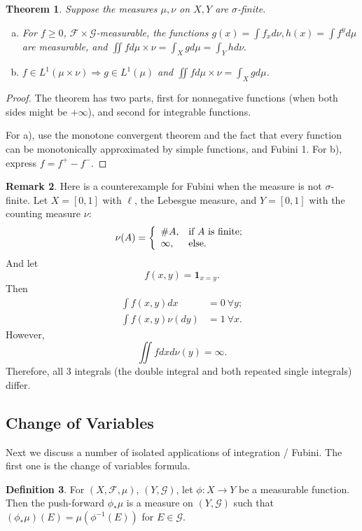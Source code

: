 \documentclass{article}
\newtheorem{theorem}{Theorem}[section]
\theoremstyle{definition}
\newtheorem{definition}[theorem]{Definition}
\newtheorem{remark}[theorem]{Remark}
\begin{document}
\begin{theorem}
	Suppose the measures $\mu,\nu$ on $X,Y$ are $\sigma$-finite.
	\begin{enumerate}[a)]
	\item For $f\geq 0$, $\mathscr{F}\times\mathscr{G}$-measurable,
		the functions $g(x)=\int f_x d\nu, h(x)=\int f^y d\mu$ are measurable, and
		$\iint f d\mu \times \nu = \int_{X} g d\mu = \int_{Y} h d\nu.$
	\item $f\in L^{1}(\mu \times \nu) \Rightarrow g\in L^{1}(\mu)$ 
		and $\iint f d\mu \times \nu = \int_{X} g d\mu$.
	\end{enumerate}
\end{theorem}
\begin{proof}
	The theorem has two parts, first for nonnegative functions
	(when both sides might be $+\infty$), 
	and second for integrable functions.

	For a), use the monotone convergent theorem
			and the fact that every function can be monotonically
			approximated by simple functions, and Fubini 1. 
	For b), express $f=f^{+}-f^{-}$.
\end{proof}
\begin{remark}
	Here is a counterexample for Fubini when the measure is not $\sigma$-finite.
	Let $X=[0,1]$ with $\ell$, the Lebesgue measure, 
	and
	$Y=[0,1]$
	with the counting measure $\nu$:
	$$\nu(A) = \left\{  
	\begin{array}{ll}
		\#A, & \textnormal{if $A$ is finite}; \\
		\infty, & \textnormal{else}.
	\end{array}\right.$$  
	And let $$f(x,y)=\mathbf{1}_{x=y}.$$
	Then 
	\begin{align*}
		\int f(x,y) dx&=0 \ \forall y;\\
		\int f(x,y) \nu(dy)& = 1 \ \forall x.
	\end{align*}
	However, $$\iint f dxd\nu(y)=\infty.$$
	Therefore, all 3 integrals
	(the double integral and both repeated single integrals)
	differ.
\end{remark}

\subsection{Change of Variables}

Next we discuss a number of isolated applications of integration / Fubini.
The first one is the change of variables formula.

\begin{definition}
	For $(X,\mathscr{F},\mu)$, $(Y,\mathscr{G})$, 
	let $\phi : X\rightarrow Y$ be a measurable function. 
	Then the push-forward $\phi_{*}\mu$ is a measure on $(Y,\mathscr{G})$ 
	such that $(\phi_{*}\mu)(E)=\mu(\phi^{-1}(E))$ for $E\in \mathscr{G}$.
\end{definition}
\end{document}

